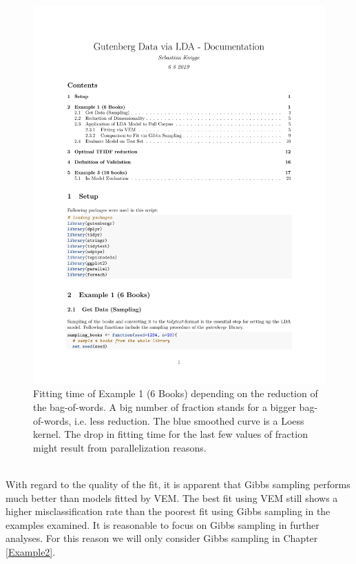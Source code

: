 \documentclass[11pt,a4paper]{article}
\begin{document}
\begin{figure}[h]
	\centering
	\includegraphics[page=15, trim=70 400 0 0,clip,width=1.1\textwidth]{LDA_Documentation.pdf}
	\caption{Fitting time of Example 1 (6 Books) depending on the reduction of the bag-of-words. A big number of fraction stands for a bigger bag-of-words, i.e. less reduction. The blue smoothed curve is a Loess kernel. The drop in fitting time for the last few values of fraction might result from parallelization reasons.}
	\label{fitting_time_tfidf}
\end{figure}
\ \\
With regard to the quality of the fit, it is apparent that Gibbs sampling performs much better than models fitted by VEM. The best fit using VEM still shows a higher misclassification rate than the poorest fit using Gibbs sampling in the examples examined. It is reasonable to focus on Gibbs sampling in further analyses. For this reason we will only consider Gibbs sampling in Chapter \ref{Example2}.\\
\end{document}
